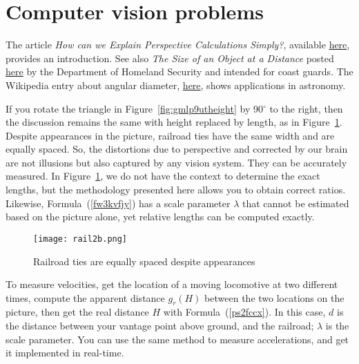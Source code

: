 \documentclass[10pt]{article}
\begin{document}
\section{Computer vision problems}\label{f8v2kde}

The article {\em How can we Explain Perspective Calculations Simply?}, available
 \href{https://www.metabunk.org/threads/how-can-we-explain-perspective-calculations-simply.10570/}{here}, 
provides an introduction. See also {\em The Size of an Object at a Distance} posted 
\href{https://www.1790.us/-search-rescuehumanhead.html}{here} by the
Department of Homeland Security and intended for coast guards. The Wikipedia entry about angular
diameter, \href{https://en.wikipedia.org/wiki/Angular_diameter}{here}, shows applications in astronomy.  
 
If you rotate the triangle in Figure~\ref{fig:gmlp9utheight} by 90$^\circ$ to the right, then the discussion 
remains the same with height replaced by length, as in Figure~\ref{fig:gmlvt2kft}. Despite
 appearances in the picture, railroad ties have the same width and are equally spaced.  So, the distortions
 due to perspective and corrected by our brain are not illusions but also captured by any vision
 system. They can be accurately measured. 
In Figure~\ref{fig:gmlvt2kft}, we do not have the context to determine the exact lengths, but the methodology presented here allows you to obtain correct ratios. Likewise, Formula~(\ref{fw3kvfjy}) has a scale parameter $\lambda$ that cannot 
 be estimated based on the picture alone, yet relative lengths can be computed exactly.
\vspace{1ex}

\begin{figure}[H]
\centering
\texttt{[image: rail2b.png]}
\caption{Railroad ties are equally spaced despite appearances}
\label{fig:gmlvt2kft}
\end{figure}

To measure velocities, get the location of a moving locomotive at two different times, compute the
 apparent distance $g_r(H)$ between the two locations on the picture, then get the real distance $H$
 with Formula~(\ref{ps2fccx}).  In this case, $d$ is the distance between your vantage point above ground, and the railroad; $\lambda$  is the scale parameter. You can use the same method to measure accelerations, and
 get it implemented in real-time. 
\end{document}
